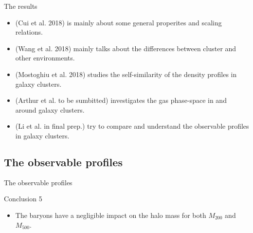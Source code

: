 \documentclass[aspectratio=43]{beamer}
\begin{document}
\begin{frame}
  \begin{center}
    {\Huge The results} \\
    \bigskip
  \end{center}

  \begin{itemize}
      \item     \hyperlink{intropaper}{} (Cui et al. 2018) is mainly about some general properites and scaling relations.
      \item \hyperlink{Wang}{} (Wang et al. 2018)  mainly talks about the differences between cluster and other environments.
      \item \hyperlink{Mostoghiu}{} (Mostoghiu et al. 2018) studies the self-similarity of the density profiles in galaxy clusters.
      \item \hyperlink{Arthur}{} (Arthur et al. to be sumbitted) investigates the gas phase-space in and around galaxy clusters.
      \item \hyperlink{Li}{} (Li et al. in final prep.) try to compare and understand the observable profiles in galaxy clusters.
  \end{itemize}
\end{frame}

\subsection{The observable profiles}\label{Li}
\begin{frame}{The observable profiles}

\end{frame}
\begin{frame}{Conclusion 5}
  {
  \begin{itemize}
    \item The baryons have a negligible impact on the halo mass for both $M_{200}$ and $M_{500}$.
  \end{itemize}}
\end{frame}
\end{document}

